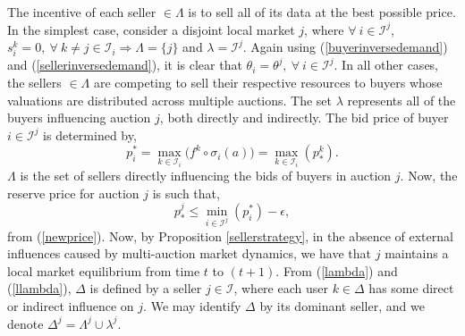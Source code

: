 \documentclass[sigconf, anonymous]{acmart}
\newcommand{\mcI}{\mathcal{I}}
\newcommand{\g}{\sigma}
\theoremstyle{definition}
\begin{document}
\iffalse
Now, we have,
\begin{equation}\label{rho}
    \rho^j(p_*^j) \le \displaystyle\sum_{i\in\mcI^j} e_i(a(s_i^j)),
\end{equation}
from (\ref{datademand}), (\ref{buyerinversedemand}),
(\ref{sellerinversedemand}), and so $p_i^j \ge p_{*}^j \ge p_i^k, \ \forall \ i \in
[p_i^j]_{i\in\mcI^j}$ and $\forall \ k \in [p_i^k]_{k\in\mcI_i}$
\fi

The incentive of each seller $\in\Lambda$ is to sell all of its data at the
best possible price. In the simplest case,
consider a disjoint local market $j$, where $\forall \ i\in\mcI^j$, $s_i^k = 0,
\ \forall \ k\ne j \in \mcI_i \Rightarrow \Lambda = \lbrace j \rbrace$ and
$\lambda = \mcI^j$. 
Again using (\ref{buyerinversedemand}) and  (\ref{sellerinversedemand}), it is
clear that $\theta_i = \theta^j, \ \forall \ i \in \mcI^j$.
In all other cases, the sellers $\in\Lambda$ are competing to sell
their respective resources to buyers whose valuations are distributed across multiple auctions. 
The set $\lambda$ represents all of the buyers influencing auction $j$, both
directly and indirectly. 
The bid price of buyer $i\in\mcI^j$ is determined by,
\begin{equation}\label{maxbid}
    p_i^* = \max_{k\in\mcI_i}\big(f^k \circ \g_i(a)\big)= \max_{k\in\mcI_i}(p_*^k).
\end{equation}
$\Lambda$ is the set of sellers directly influencing the bids of buyers
in auction $j$. Now, the reserve price for auction $j$ is such that,
\begin{equation}\label{resprice}
    p_*^j \le \min_{i\in\mcI^j}(p_i^*) - \epsilon,
\end{equation}
from (\ref{newprice}). Now, by Proposition \ref{sellerstrategy}, in the absence
of external influences caused by multi-auction market dynamics, we have 
that $j$ maintains a local market equilibrium from time $t$ to $(t+1)$.
From (\ref{lambda}) and (\ref{llambda}), $\Delta$ is defined by a seller $j\in\mcI$, where each
user $k\in\Delta$ has some direct or indirect influence on $j$. 
We may identify $\Delta$ by its dominant seller, and we denote $\Delta^j = \Lambda^j
\cup \lambda^j$.
\end{document}

